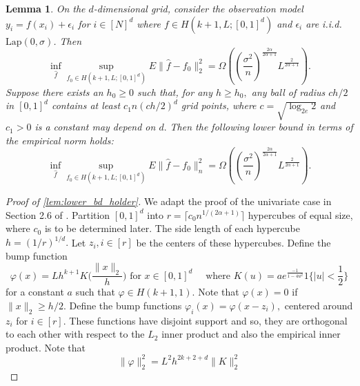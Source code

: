 \documentclass[ejs,noshowframe]{imsart}
\theoremstyle{plain}
\newtheorem{lemma}[theorem]{Lemma}
\theoremstyle{definition}
\newcommand{\E}{E}
\renewcommand{\hat}{\widehat}
\begin{document}
\begin{appendix}
\begin{lemma}
\label{lem:lower_bd_holder}
On the $d$-dimensional grid, consider the observation model $y_i = f(x_i) + 
\epsilon_i$ for $i\in [N]^d$ where $f \in H(k+1, L; [0,1]^d)$ and $\epsilon_i$ 
are i.i.d. $\mathrm{Lap}(0,\sigma)$. Then 
\begin{equation}
\label{eq:holder_lower_bd_gauss_L2}
\inf_{\hat f} \sup_{f_0 \in H(k+1, L; [0,1]^d)} \E \| \hat f - f_0 \|_2^2 = 
	\Omega \left(  \left( \frac{\sigma^2}{n} 
\right)^{\frac{2\alpha}{2\alpha+1}} 
							L^{\frac{2}{2\alpha+1}}
				\right).
\end{equation}
Suppose there exists an $h_0 \ge 0$ such that, for any $h\ge h_0,$
any ball of radius $ch/2$ in $[0, 1]^d$ contains at least $c_1 n (ch/2)^d$ grid 
points, where
$c=\sqrt{\log_{2e}{2}}$ and $c_1 > 0$ is a constant  may depend on $d.$ Then
the following lower bound in terms of the empirical norm holds:
\begin{equation}
	\label{eq:holder_lower_bd_gauss_emp}
	\inf_{\hat f} \sup_{f_0 \in H(k+1, L; [0,1]^d)} \E \| \hat f - f_0 
\|_n^2 = 
	\Omega \left(  \left( \frac{\sigma^2}{n} 
\right)^{\frac{2\alpha}{2\alpha+1}} 
	L^{\frac{2}{2\alpha+1}}
	\right).
\end{equation}
\end{lemma}
\begin{proof}[Proof of \autoref{lem:lower_bd_holder}]
We adapt the proof of the univariate case in Section 2.6 of 
\cite{tsybakov2009introduction}.
Partition $[0,1]^d$ into $r = \lceil c_0 n^{1/(2\alpha+1)} \rceil$ hypercubes 
of equal size, where $c_0$ is to be determined later.
The side length of each hypercube $h=(1/r)^{1/d}.$
Let $z_i, i\in [r]$ be the centers of these hypercubes. 
Define the bump function
\begin{equation*}
\varphi(x) = L  h^{k+1} K \bigg( \frac{\|x\|_2}{h}\bigg)
\text{ for } x \in [0,1]^d
\quad
\text{ where }
K(u) = a e^{\frac{-1}{1-4u^2}} 1 \big\{ |u| < \frac 12 \big\}
\end{equation*}
for a constant $a$ such that $\varphi \in H(k+1, 1).$ 
Note that $\varphi(x) = 0$ if $\|x\|_2 \ge h/2.$
Define the bump functions  $\varphi_i(x) = \varphi(x - z_i),$ centered around 
$z_i$ for $i\in[r].$
These functions have disjoint support and so, they are orthogonal to each other 
with respect to the $L_2$ inner product and also the empirical inner product.
Note that 
\begin{equation}
\label{eq:bump_l2_norm}
\| \varphi \|_2^2 = L^2 h^{2k+2+d} \| K \|_2^2
\end{equation}



\end{proof}
\end{appendix}
\end{document}
